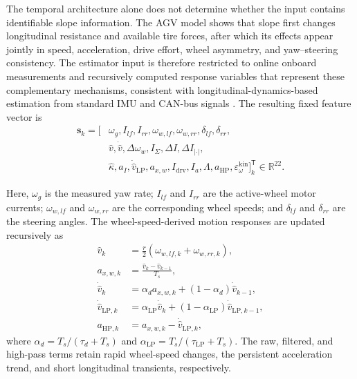 \documentclass{ieeeaccess}
\newcommand{\citep}[1]{\cite{#1}}
\begin{document}
The temporal architecture alone does not determine whether the input contains identifiable slope information. The AGV model shows that slope first changes longitudinal resistance and available tire forces, after which its effects appear jointly in speed, acceleration, drive effort, wheel asymmetry, and yaw--steering consistency. The estimator input is therefore restricted to online onboard measurements and recursively computed response variables that represent these complementary mechanisms, consistent with longitudinal-dynamics-based estimation from standard IMU and CAN-bus signals \citep{Jensen2022MassGradeIMUCAN}. The resulting fixed feature vector is
\begin{equation}
\begin{aligned}
\mathbf{s}_k=\big[&
\omega_{g},I_{lf},I_{rr},\omega_{w,lf},\omega_{w,rr},
\delta_{lf},\delta_{rr},\\
&\hat v,\dot{\hat v},\Delta\omega_w,I_{\Sigma},
\Delta I,\Delta I_{|\cdot|},\\
&\hat\kappa,a_I,\dot{\hat v}_{\mathrm{LP}},a_{x,w},
I_{\mathrm{drv}},I_a,\Lambda,a_{\mathrm{HP}},\varepsilon_{\omega}^{\mathrm{kin}}
\big]_k^{\mathsf T}\in\mathbb R^{22}.
\end{aligned}
\label{eq:feature_vector_22d}
\end{equation}

Here, $\omega_g$ is the measured yaw rate; $I_{lf}$ and $I_{rr}$ are the active-wheel motor currents; $\omega_{w,lf}$ and $\omega_{w,rr}$ are the corresponding wheel speeds; and $\delta_{lf}$ and $\delta_{rr}$ are the steering angles. The wheel-speed-derived motion responses are updated recursively as
\begin{align}
\hat v_k&=\frac{r}{2}\left(\omega_{w,lf,k}+\omega_{w,rr,k}\right),\nonumber\\
a_{x,w,k}&=\frac{\hat v_k-\hat v_{k-1}}{T_s},\nonumber\\
\dot{\hat v}_k&=\alpha_d a_{x,w,k}
+(1-\alpha_d)\dot{\hat v}_{k-1},\nonumber\\
\dot{\hat v}_{\mathrm{LP},k}
&=\alpha_{\mathrm{LP}}\dot{\hat v}_k
+(1-\alpha_{\mathrm{LP}})\dot{\hat v}_{\mathrm{LP},k-1},\nonumber\\
a_{\mathrm{HP},k}&=a_{x,w,k}-\dot{\hat v}_{\mathrm{LP},k},
\label{eq:kinematic_feature_channels}
\end{align}
where $\alpha_d=T_s/(\tau_d+T_s)$ and $\alpha_{\mathrm{LP}}=T_s/(\tau_{\mathrm{LP}}+T_s)$. The raw, filtered, and high-pass terms retain rapid wheel-speed changes, the persistent acceleration trend, and short longitudinal transients, respectively.
\end{document}
